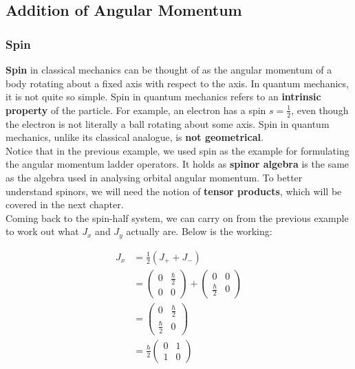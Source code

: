 \documentclass{article}
\begin{document}
\begin{flushleft}
\subsection{Addition of Angular Momentum}
\subsubsection{Spin}
\textbf{Spin} in classical mechanics can be thought of as the angular momentum of a body rotating about a fixed axis with respect to the axis. In quantum mechanics, it is not quite so simple. Spin in quantum mechanics refers to an \textbf{intrinsic property} of the particle. For example, an electron has a spin $s=\frac{1}{2}$, even though the electron is not literally a ball rotating about some axis. Spin in quantum mechanics, unlike its classical analogue, is \textbf{not geometrical}.\\[0.5cm]

Notice that in the previous example, we used spin as the example for formulating the angular momentum ladder operators. It holds as \textbf{spinor algebra} is the same as the algebra used in analysing orbital angular momentum. To better understand spinors, we will need the notion of \textbf{tensor products}, which will be covered in the next chapter.\\[0.5cm]

Coming back to the spin-half system, we can carry on from the previous example to work out what $J_x$ and $J_y$ actually are. Below is the working:

\begin{align*}
J_x&=\frac{1}{2}(J_++J_-)\\
&=\begin{pmatrix}
    0&\frac{\hbar}{2}\\
    0&0
\end{pmatrix}
+
\begin{pmatrix}
    0&0\\
    \frac{\hbar}{2}&0
\end{pmatrix}\\
&= \begin{pmatrix}
    0&\frac{\hbar}{2}\\
    \frac{\hbar}{2}&0
\end{pmatrix}\\
&=\frac{\hbar}{2}
\begin{pmatrix}
0&1\\
1&0    
\end{pmatrix}
\end{align*}


\end{flushleft}
\end{document}
